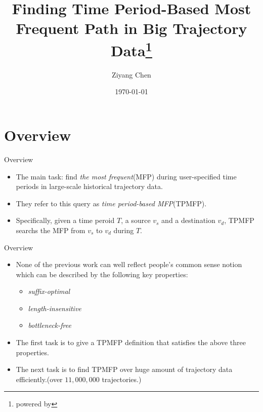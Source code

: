\documentclass[mathserif]{beamer}
\title[Finding TPMFP in BTD]{Finding Time Period-Based Most Frequent Path in Big Trajectory Data\thanks{powered by \XeLaTeX} }
\author{Ziyang Chen}
\institute[FDU]
{
	Fudan University\\
	\medskip
	\textit{13307130148@fudan.edu.cn}
}
\date{\today}
\begin{document}
\newtheorem{property}[theorem]{\textsc{Property}}
\newtheorem{defination}[theorem]{\textsc{Defination}}
\newtheorem{theore}[theorem]{\textsc{Theorem}}
\newtheorem{lemm}[theorem]{\textsc{Lemma}}

\begin{frame}
\titlepage
\end{frame}


\section{Overview}
\begin{frame}{Overview}
	\begin{itemize}
	\item The main task: find \textit{the most frequent}(MFP) during user-specified time periods in large-scale historical trajectory data.
	\item They refer to this query as \textit{time period-based MFP}(TPMFP).
	\item Specifically, given a time peroid $T$, a source $v_s$ and a destination $v_d$, TPMFP searchs the MFP from $v_s$ to $v_d$ during $T$.
	\end{itemize}
\end{frame}

\begin{frame}{Overview}
	\begin{itemize}
	\item None of the previous work can well reflect people's common sense notion which can be described by the following key properties:\\
		\begin{itemize}
		\item \textit{suffix-optimal}
		\item \textit{length-insensitive}
		\item \textit{bottleneck-free}
		\end{itemize}
	\item The first task is to give a TPMFP definition that satisfies the above three properties.
	\item The next task is to find TPMFP over huge amount of trajectory data efficiently.(over $11,000,000$ trajectories.)
	\end{itemize}
\end{frame}
\end{document}
